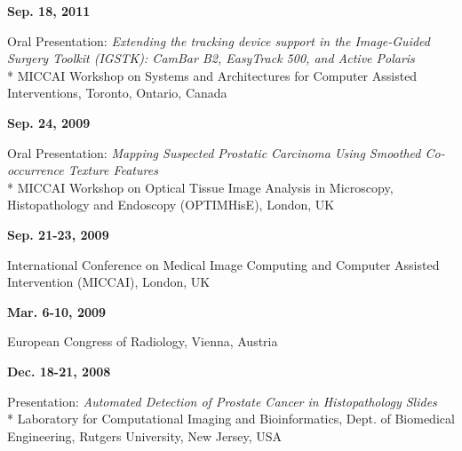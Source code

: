 \documentclass[line,a4paper]{resume}
\begin{document}
\begin{resume}
\noindent
\begin{minipage}[t]{0.20\linewidth}
\textbf{Sep. 18, 2011}
\end{minipage}
\begin{minipage}[t]{0.80\linewidth}\raggedright
Oral Presentation: \emph{Extending the tracking device support in the Image-Guided Surgery Toolkit (IGSTK): CamBar B2, EasyTrack 500, and Active Polaris}\\*
MICCAI Workshop on Systems and Architectures for Computer Assisted Interventions, Toronto, Ontario, Canada
\end{minipage}

\noindent
\begin{minipage}[t]{0.20\linewidth}
\textbf{Sep. 24, 2009}
\end{minipage}
\begin{minipage}[t]{0.80\linewidth}\raggedright
Oral Presentation: \emph{Mapping Suspected Prostatic Carcinoma Using Smoothed Co-occurrence Texture Features}\\*
MICCAI Workshop on Optical Tissue Image Analysis in Microscopy, Histopathology and Endoscopy (OPTIMHisE), London, UK
\end{minipage}

\noindent
\begin{minipage}[t]{0.20\linewidth}
\textbf{Sep. 21-23, 2009}
\end{minipage}
\begin{minipage}[t]{0.80\linewidth}\raggedright
International Conference on Medical Image Computing and Computer Assisted Intervention (MICCAI), London, UK
\end{minipage}

\begin{minipage}[t]{0.20\linewidth}
\textbf{Mar. 6-10, 2009}
\end{minipage}
\begin{minipage}[t]{0.80\linewidth}\raggedright
European Congress of Radiology, Vienna, Austria
\end{minipage}

\noindent
\begin{minipage}[t]{0.20\linewidth}
\textbf{Dec. 18-21, 2008}
\end{minipage}
\begin{minipage}[t]{0.80\linewidth}\raggedright
Presentation: \emph{Automated Detection of Prostate Cancer in Histopathology Slides}\\*
Laboratory for Computational Imaging and Bioinformatics, Dept. of Biomedical Engineering, Rutgers University, New Jersey, USA


\end{minipage}
\end{resume}
\end{document}
